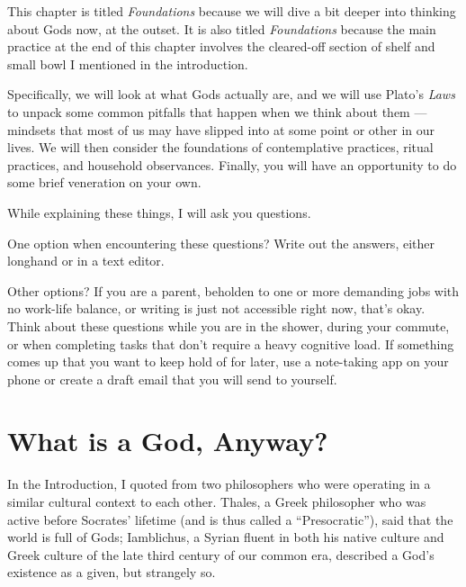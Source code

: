 \documentclass[
]{book}
\begin{document}
This chapter is titled \emph{Foundations} because we will dive a bit deeper into thinking about Gods now, at the outset. It is also titled \emph{Foundations} because the main practice at the end of this chapter involves the cleared-off section of shelf and small bowl I mentioned in the introduction.

Specifically, we will look at what Gods actually are, and we will use Plato's \emph{Laws} to unpack some common pitfalls that happen when we think about them --- mindsets that most of us may have slipped into at some point or other in our lives. We will then consider the foundations of contemplative practices, ritual practices, and household observances. Finally, you will have an opportunity to do some brief veneration on your own.

While explaining these things, I will ask you questions.

One option when encountering these questions? Write out the answers, either longhand or in a text editor.

Other options? If you are a parent, beholden to one or more demanding jobs with no work-life balance, or writing is just not accessible right now, that's okay. Think about these questions while you are in the shower, during your commute, or when completing tasks that don't require a heavy cognitive load. If something comes up that you want to keep hold of for later, use a note-taking app on your phone or create a draft email that you will send to yourself.

\hypertarget{what-is-a-god-anyway}{%
\section{What is a God, Anyway?}\label{what-is-a-god-anyway}}

In the Introduction, I quoted from two philosophers who were operating in a similar cultural context to each other. Thales, a Greek philosopher who was active before Socrates' lifetime (and is thus called a ``Presocratic''), said that the world is full of Gods; Iamblichus, a Syrian fluent in both his native culture and Greek culture of the late third century of our common era, described a God's existence as a given, but strangely so.
\end{document}
